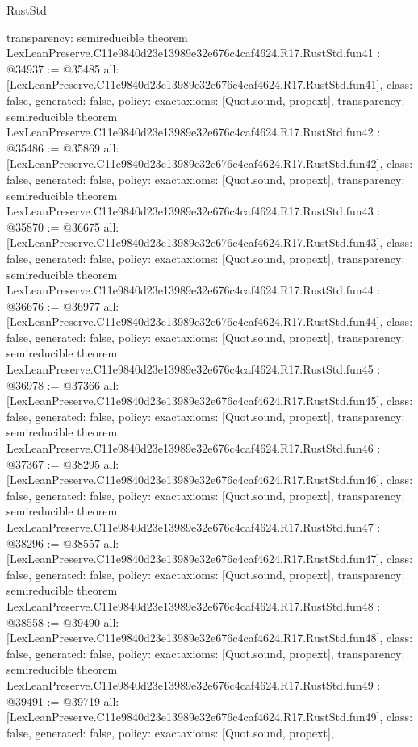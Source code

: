 \begin{lexlean}{RustStd}
\begin{coremodule}
{  transparency: semireducible
}
theorem LexLeanPreserve.C11e9840d23e13989e32e676c4caf4624.R17.RustStd.fun41 : @34937 := @35485 {
  all: [LexLeanPreserve.C11e9840d23e13989e32e676c4caf4624.R17.RustStd.fun41],
  class: false,
  generated: false,
  policy: exact{axioms: [Quot.sound, propext]},
  transparency: semireducible
}
theorem LexLeanPreserve.C11e9840d23e13989e32e676c4caf4624.R17.RustStd.fun42 : @35486 := @35869 {
  all: [LexLeanPreserve.C11e9840d23e13989e32e676c4caf4624.R17.RustStd.fun42],
  class: false,
  generated: false,
  policy: exact{axioms: [Quot.sound, propext]},
  transparency: semireducible
}
theorem LexLeanPreserve.C11e9840d23e13989e32e676c4caf4624.R17.RustStd.fun43 : @35870 := @36675 {
  all: [LexLeanPreserve.C11e9840d23e13989e32e676c4caf4624.R17.RustStd.fun43],
  class: false,
  generated: false,
  policy: exact{axioms: [Quot.sound, propext]},
  transparency: semireducible
}
theorem LexLeanPreserve.C11e9840d23e13989e32e676c4caf4624.R17.RustStd.fun44 : @36676 := @36977 {
  all: [LexLeanPreserve.C11e9840d23e13989e32e676c4caf4624.R17.RustStd.fun44],
  class: false,
  generated: false,
  policy: exact{axioms: [Quot.sound, propext]},
  transparency: semireducible
}
theorem LexLeanPreserve.C11e9840d23e13989e32e676c4caf4624.R17.RustStd.fun45 : @36978 := @37366 {
  all: [LexLeanPreserve.C11e9840d23e13989e32e676c4caf4624.R17.RustStd.fun45],
  class: false,
  generated: false,
  policy: exact{axioms: [Quot.sound, propext]},
  transparency: semireducible
}
theorem LexLeanPreserve.C11e9840d23e13989e32e676c4caf4624.R17.RustStd.fun46 : @37367 := @38295 {
  all: [LexLeanPreserve.C11e9840d23e13989e32e676c4caf4624.R17.RustStd.fun46],
  class: false,
  generated: false,
  policy: exact{axioms: [Quot.sound, propext]},
  transparency: semireducible
}
theorem LexLeanPreserve.C11e9840d23e13989e32e676c4caf4624.R17.RustStd.fun47 : @38296 := @38557 {
  all: [LexLeanPreserve.C11e9840d23e13989e32e676c4caf4624.R17.RustStd.fun47],
  class: false,
  generated: false,
  policy: exact{axioms: [Quot.sound, propext]},
  transparency: semireducible
}
theorem LexLeanPreserve.C11e9840d23e13989e32e676c4caf4624.R17.RustStd.fun48 : @38558 := @39490 {
  all: [LexLeanPreserve.C11e9840d23e13989e32e676c4caf4624.R17.RustStd.fun48],
  class: false,
  generated: false,
  policy: exact{axioms: [Quot.sound, propext]},
  transparency: semireducible
}
theorem LexLeanPreserve.C11e9840d23e13989e32e676c4caf4624.R17.RustStd.fun49 : @39491 := @39719 {
  all: [LexLeanPreserve.C11e9840d23e13989e32e676c4caf4624.R17.RustStd.fun49],
  class: false,
  generated: false,
  policy: exact{axioms: [Quot.sound, propext]},
}
\end{coremodule}
\end{lexlean}
